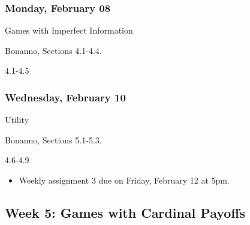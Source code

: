 \documentclass[
]{article}
\providecommand{\tightlist}{%
  \setlength{\itemsep}{0pt}\setlength{\parskip}{0pt}}
\begin{document}
\begin{multicols}{2}

\hypertarget{monday-february-08}{%
\subsubsection{Monday, February 08}\label{monday-february-08}}

\begin{description}
\tightlist
\item[Topic]
Games with Imperfect Information
\item[Reading]
Bonanno, Sections 4.1-4.4.
\item[Lectures]
4.1-4.5
\end{description}

\hypertarget{wednesday-february-10}{%
\subsubsection{Wednesday, February 10}\label{wednesday-february-10}}

\begin{description}
\tightlist
\item[Topic]
Utility
\item[Reading]
Bonanno, Sections 5.1-5.3.
\item[Lectures]
4.6-4.9
\end{description}

\end{multicols}

\begin{itemize}
\tightlist
\item
  Weekly assignment 3 due on Friday, February 12 at 5pm.
\end{itemize}

\newpage

\hypertarget{week-5-games-with-cardinal-payoffs}{%
\subsection{Week 5: Games with Cardinal
Payoffs}\label{week-5-games-with-cardinal-payoffs}}
\end{document}
